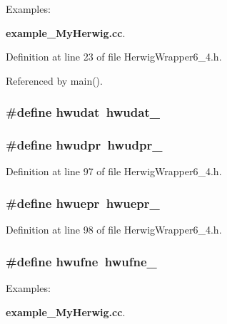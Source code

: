 \begin{Desc}
\item[Examples: ]\par
{\bf example\_\-My\-Herwig.cc}.\end{Desc}


Definition at line 23 of file Herwig\-Wrapper6\_\-4.h.

Referenced by main().
\subsubsection{\setlength{\rightskip}{0pt plus 5cm}\#define hwudat~hwudat\_\-}\label{HerwigWrapper6__4_8h_8f316c33c0489de94d95dddf5eaf7046}


\subsubsection{\setlength{\rightskip}{0pt plus 5cm}\#define hwudpr~hwudpr\_\-}\label{HerwigWrapper6__4_8h_1601f048a420c20dc15c03b3027ef48a}




Definition at line 97 of file Herwig\-Wrapper6\_\-4.h.
\subsubsection{\setlength{\rightskip}{0pt plus 5cm}\#define hwuepr~hwuepr\_\-}\label{HerwigWrapper6__4_8h_8e313ce063d207708f4386a71e1e69d6}




Definition at line 98 of file Herwig\-Wrapper6\_\-4.h.
\subsubsection{\setlength{\rightskip}{0pt plus 5cm}\#define hwufne~hwufne\_\-}\label{HerwigWrapper6__4_8h_2eb221c0e84901935d786f855c533ba2}


\begin{Desc}
\item[Examples: ]\par
{\bf example\_\-My\-Herwig.cc}.\end{Desc}


